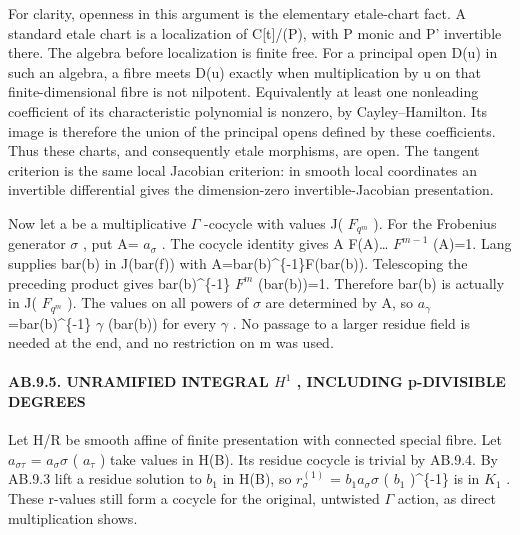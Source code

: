\documentclass[
  11pt,
]{article}
\begin{document}
For clarity, openness in this argument is the elementary etale-chart
fact. A standard etale chart is a localization of C{[}t{]}/(P), with P
monic and P' invertible there. The algebra before localization is finite
free. For a principal open D(u) in such an algebra, a fibre meets D(u)
exactly when multiplication by u on that finite-dimensional fibre is not
nilpotent. Equivalently at least one nonleading coefficient of its
characteristic polynomial is nonzero, by Cayley--Hamilton. Its image is
therefore the union of the principal opens defined by these
coefficients. Thus these charts, and consequently etale morphisms, are
open. The tangent criterion is the same local Jacobian criterion: in
smooth local coordinates an invertible differential gives the
dimension-zero invertible-Jacobian presentation.

Now let a be a multiplicative \(\Gamma\) -cocycle with values J(
\(F_{q^m}\) ). For the Frobenius generator \(\sigma\) , put A=
\(a_{\sigma}\) . The cocycle identity gives A F(A)\ldots{} \(F^{m-1}\)
(A)=1. Lang supplies bar(b) in J(bar(f)) with
A=bar(b)\^{}\{-1\}F(bar(b)). Telescoping the preceding product gives
bar(b)\^{}\{-1\} \(F^m\) (bar(b))=1. Therefore bar(b) is actually in J(
\(F_{q^m}\) ). The values on all powers of \(\sigma\) are determined by
A, so \(a_{\gamma}\) =bar(b)\^{}\{-1\} \(\gamma\) (bar(b)) for every
\(\gamma\) . No passage to a larger residue field is needed at the end,
and no restriction on m was used.

\paragraph{\texorpdfstring{AB.9.5. UNRAMIFIED INTEGRAL \(H^1\) ,
INCLUDING p-DIVISIBLE
DEGREES}{AB.9.5. UNRAMIFIED INTEGRAL H\^{}1 , INCLUDING p-DIVISIBLE DEGREES}}\label{ab.9.5.-unramified-integral-h1-including-p-divisible-degrees}

Let H/R be smooth affine of finite presentation with connected special
fibre. Let \(a_{\sigma \tau}\) = \(a_{\sigma} \sigma\) ( \(a_{\tau}\) )
take values in H(B). Its residue cocycle is trivial by AB.9.4. By AB.9.3
lift a residue solution to \(b_{1}\) in H(B), so \(r^{(1)}_{\sigma}\) =
\(b_{1} a_{\sigma} \sigma\) ( \(b_{1}\) )\^{}\{-1\} is in \(K_{1}\) .
These r-values still form a cocycle for the original, untwisted
\(\Gamma\) action, as direct multiplication shows.
\end{document}
